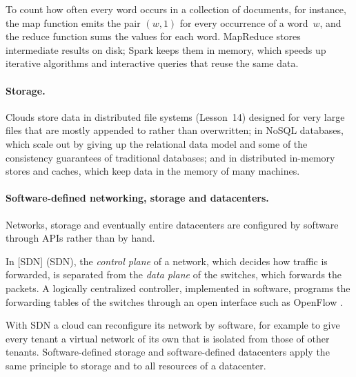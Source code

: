 \documentclass[../main.tex]{subfiles}
\begin{document}
To count how often every word occurs in a collection of documents, for
instance, the map function emits the pair $(w, 1)$ for every occurrence of a
word~$w$, and the reduce function sums the values for each
word.
MapReduce
stores intermediate results on disk; Spark \cite{zaharia2012} keeps them in
memory, which speeds up iterative algorithms and interactive queries that
reuse the same data.

\paragraph{Storage.}  Clouds store data in distributed file systems
(Lesson~14) designed for very large files that are mostly appended to rather
than overwritten; in NoSQL databases, which scale out by giving
up the relational data model and some of the consistency guarantees of traditional
databases; and in distributed in-memory stores and caches, which keep data
in the memory of many machines.

\paragraph{Software-defined networking, storage and datacenters.}
Networks, storage and eventually entire datacenters are configured by
software through APIs rather than by hand.

\begin{definition}
  In
  [SDN]
  (SDN), the \emph{control plane} of a network, which decides how traffic is
  forwarded, is separated from the \emph{data plane} of the switches, which
  forwards the packets.  A logically centralized controller, implemented in
  software, programs the forwarding tables of the switches through an open
  interface such as OpenFlow \cite{mckeown2008}.
\end{definition}

With SDN a cloud can reconfigure its network by software, for example to
give every tenant a virtual network of its own that is isolated from those
of other tenants.  Software-defined storage and
software-defined datacenters apply the same principle to storage and to all
resources of a datacenter.
\end{document}
